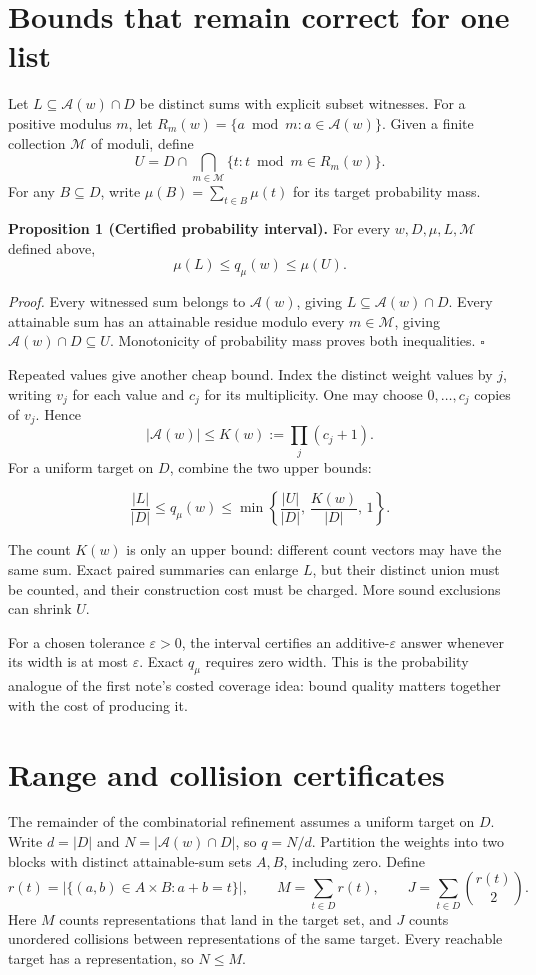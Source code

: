 \documentclass[10pt,english]{article}
\begin{document}
\section{Bounds that remain correct for one list}
Let \(L\subseteq\mathcal A(w)\cap D\) be distinct sums with explicit subset witnesses. For a positive modulus \(m\), let \(R_m(w)=\{a\bmod m:a\in\mathcal A(w)\}\). Given a finite collection \(\mathcal M\) of moduli, define
\[
U=D\cap\bigcap_{m\in\mathcal M}\{t:t\bmod m\in R_m(w)\}.
\]
For any \(B\subseteq D\), write \(\mu(B)=\sum_{t\in B}\mu(t)\) for its
target probability mass.
\begin{tcolorbox}[accentbox]
\textbf{Proposition 1 (Certified probability interval).}
For every \(w,D,\mu,L,\mathcal M\) defined above,
\[
\mu(L)\le q_\mu(w)\le\mu(U).
\]
\end{tcolorbox}
\textit{Proof.} Every witnessed sum belongs to \(\mathcal A(w)\), giving \(L\subseteq\mathcal A(w)\cap D\). Every attainable sum has an attainable residue modulo every \(m\in\mathcal M\), giving \(\mathcal A(w)\cap D\subseteq U\). Monotonicity of probability mass proves both inequalities. \hfill\(\square\)

Repeated values give another cheap bound. Index the distinct weight
values by \(j\), writing \(v_j\) for each value and \(c_j\) for its
multiplicity. One may choose \(0,\ldots,c_j\) copies of \(v_j\). Hence
\[
|\mathcal A(w)|\le K(w):=\prod_j(c_j+1).
\]
For a uniform target on \(D\), combine the two upper bounds:
\begin{tcolorbox}[accentbox]
\[
\frac{|L|}{|D|}\le q_\mu(w)\le
\min\left\{\frac{|U|}{|D|},\,\frac{K(w)}{|D|},\,1\right\}.
\]
\end{tcolorbox}
The count \(K(w)\) is only an upper bound: different count vectors may have the same sum. Exact paired summaries can enlarge \(L\), but their distinct union must be counted, and their construction cost must be charged. More sound exclusions can shrink \(U\).

For a chosen tolerance \(\varepsilon>0\), the interval certifies an
additive-\(\varepsilon\) answer whenever its width is at most
\(\varepsilon\). Exact \(q_\mu\) requires zero width. This is the
probability analogue of the first note's costed coverage idea: bound
quality matters together with the cost of producing it.

\section{Range and collision certificates}
The remainder of the combinatorial refinement assumes a uniform target on
\(D\). Write \(d=|D|\) and \(N=|\mathcal A(w)\cap D|\), so \(q=N/d\).
Partition the weights into two blocks with distinct attainable-sum sets
\(A,B\), including zero. Define
\[
r(t)=|\{(a,b)\in A\times B:a+b=t\}|,\qquad
M=\sum_{t\in D}r(t),\qquad J=\sum_{t\in D}\binom{r(t)}2.
\]
Here \(M\) counts representations that land in the target set, and \(J\)
counts unordered collisions between representations of the same target.
Every reachable target has a representation, so \(N\le M\).
\end{document}
